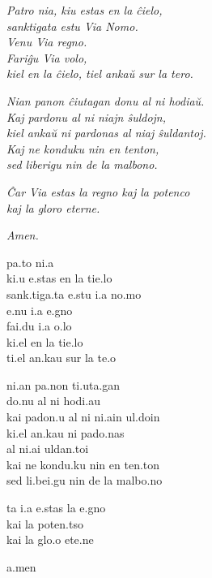 \documentclass[a4paper,11pt,article,oneside]{memoir}
\begin{document}
\begin{multicols*}{2}
    \textit{Patro nia, kiu estas en la ĉielo, \\
    sanktigata estu Via Nomo. \\
    Venu Via regno. \\
    Fariĝu Via volo, \\
    kiel en la ĉielo, tiel ankaŭ sur la tero.}

    \textit{Nian panon ĉiutagan donu al ni hodiaŭ. \\
    Kaj pardonu al ni niajn ŝuldojn, \\
    kiel ankaŭ ni pardonas al niaj ŝuldantoj. \\
    Kaj ne konduku nin en tenton, \\
    sed liberigu nin de la malbono.}

    \textit{Ĉar Via estas la regno 
    kaj la potenco \\
    kaj la gloro eterne.}

    \textit{Amen.}
    
    \columnbreak

    \prstr pa.t\alvrap o \prstr ni.a\\
    \prstr ki.u \prstr e.stas en la t\tiebar\esh i\prstr e.lo\\
    \scstr sank.ti\prstr ga.ta \prstr e.stu \prstr \labrox i.a \prstr no.mo\\
    \prstr\labrox e.nu \prstr\labrox i.a \prstr\alvrap e.gno\\
    fa\prstr\alvrap i.d\tiebar\ezh u \prstr\labrox i.a \prstr\labrox o.lo\\
    \prstr ki.el en la t\tiebar\esh i\prstr e.lo\\
    \prstr ti.el \prstr an.kau\nsylb{} sur la \prstr te.\alvrap o

    \prstr ni.an \prstr pa.non \scstr t\tiebar\esh i.u\prstr ta.gan\\
    \prstr do.nu al ni ho\prstr di.au\nsylb{}\\
    kai\nsylb{} pa\alvrap\prstr don.u al ni \prstr ni.ai\nsylb{}n \prstr\esh ul.doi\nsylb{}n\\
    \prstr ki.el \prstr an.kau\nsylb{} ni pa\alvrap\prstr do.nas\\
    al \prstr ni.ai\nsylb{} \esh ul\prstr dan.toi\nsylb{}\\
    kai\nsylb{} ne kon\prstr du.ku nin en \prstr ten.ton\\
    sed \scstr li.be\prstr\alvrap i.gu nin de la mal\prstr bo.no

    t\tiebar\esh a\alvrap{} \prstr\labrox i.a \prstr e.stas la \prstr \alvrap e.gno\\
    kai\nsylb{} la po\prstr ten.t\tiebar so\\
    kai\nsylb{} la \prstr glo.\alvrap o e\prstr te\alvrap.ne

    \prstr a.men

    \end{multicols*}
\end{document}
